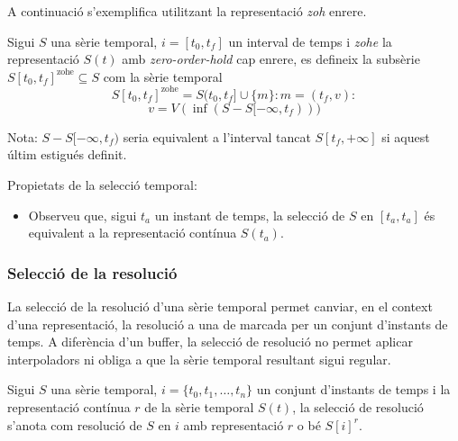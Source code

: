 A continuació s'exemplifica utilitzant la representació \emph{zoh} enrere.


\begin{definition}
  Sigui $S$ una sèrie temporal, $i=[t_0,t_f]$ un interval de temps i
  \emph{zohe} la representació $S(t)$ amb \emph{zero-order-hold} cap
  enrere, es defineix la subsèrie $S[t_0,t_f]^{\text{zohe}}\subseteq
  S$ com la sèrie temporal 
  \[
  S[t_0,t_f]^{\text{zohe}} = S(t_0,t_f] \cup \{m\} : m=(t_f,v):
  \]
  \[
  v=  V(\inf(S-S[-\infty,t_f)))
  \]

  
  Nota: $S-S[-\infty,t_f)$ seria equivalent a l'interval tancat
  $S[t_f,+\infty]$ si aquest últim estigués definit.
\end{definition}

Propietats de la selecció temporal:

\begin{itemize}
\item Observeu que, sigui $t_a$ un instant de temps, la selecció de $S$ en $[t_a,t_a]$ és equivalent a la representació contínua $S(t_a)$. 
\end{itemize}







\subsubsection{Selecció de la resolució}

La selecció de la resolució d'una sèrie temporal permet canviar, en el
context d'una representació, la resolució a una de marcada per un
conjunt d'instants de temps. A diferència d'un buffer, la selecció de
resolució no permet aplicar interpoladors ni obliga a que la sèrie
temporal resultant sigui regular.

Sigui $S$ una sèrie temporal, $i= \{t_0,t_1,\dotsc,t_n\}$ un conjunt
d'instants de temps i la representació contínua $r$ de la sèrie
temporal $S(t)$, la selecció de resolució s'anota com resolució de $S$
en $i$ amb representació $r$ o bé $S[i]^r$.

